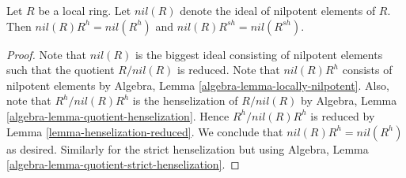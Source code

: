 \begin{lemma}
\label{lemma-henselization-nil}
Let $R$ be a local ring. Let $nil(R)$ denote the ideal of
nilpotent elements of $R$. Then $nil(R)R^h = nil(R^h)$ and
$nil(R)R^{sh} = nil(R^{sh})$.
\end{lemma}

\begin{proof}
Note that $nil(R)$ is the biggest ideal consisting of nilpotent elements
such that the quotient $R/nil(R)$ is reduced. Note that $nil(R)R^h$
consists of nilpotent elements by
Algebra, Lemma \ref{algebra-lemma-locally-nilpotent}.
Also, note that $R^h/nil(R) R^h$ is the
henselization of $R/nil(R)$ by
Algebra, Lemma \ref{algebra-lemma-quotient-henselization}.
Hence $R^h/nil(R)R^h$ is reduced by
Lemma \ref{lemma-henselization-reduced}.
We conclude that $nil(R) R^h = nil(R^h)$ as desired.
Similarly for the strict henselization but using
Algebra, Lemma \ref{algebra-lemma-quotient-strict-henselization}.
\end{proof}
